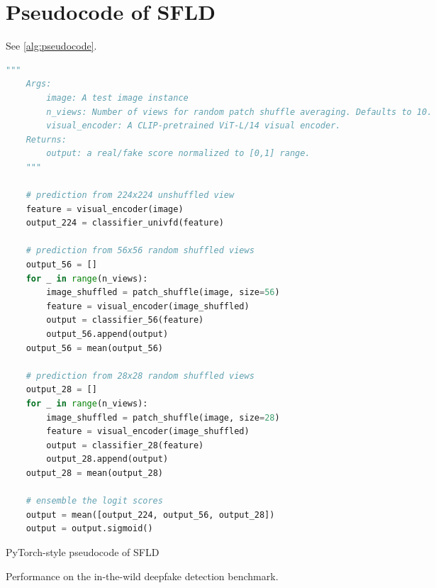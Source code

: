 \section{Pseudocode of SFLD}
\label{sec:pseudocode}
See \cref{alg:pseudocode}. 


\begin{algorithm}[h]
    \begin{lstlisting}[language=python]
    """
    Args: 
        image: A test image instance
        n_views: Number of views for random patch shuffle averaging. Defaults to 10. 
        visual_encoder: A CLIP-pretrained ViT-L/14 visual encoder.
    Returns: 
        output: a real/fake score normalized to [0,1] range.
    """

    # prediction from 224x224 unshuffled view
    feature = visual_encoder(image)
    output_224 = classifier_univfd(feature)

    # prediction from 56x56 random shuffled views
    output_56 = []
    for _ in range(n_views): 
        image_shuffled = patch_shuffle(image, size=56)
        feature = visual_encoder(image_shuffled)
        output = classifier_56(feature)
        output_56.append(output)
    output_56 = mean(output_56)

    # prediction from 28x28 random shuffled views
    output_28 = []
    for _ in range(n_views): 
        image_shuffled = patch_shuffle(image, size=28)
        feature = visual_encoder(image_shuffled)
        output = classifier_28(feature)
        output_28.append(output)
    output_28 = mean(output_28)

    # ensemble the logit scores
    output = mean([output_224, output_56, output_28])
    output = output.sigmoid()
    \end{lstlisting}
    \caption{PyTorch-style pseudocode of SFLD}
    \label{alg:pseudocode}
\end{algorithm}

\begin{table}[t]
    \centering
    \resizebox{0.55\linewidth}{!}{
        
    }
    \caption{Performance on the in-the-wild deepfake detection benchmark.}
    \label{tab:rebuttal-deepfake}
\end{table}



